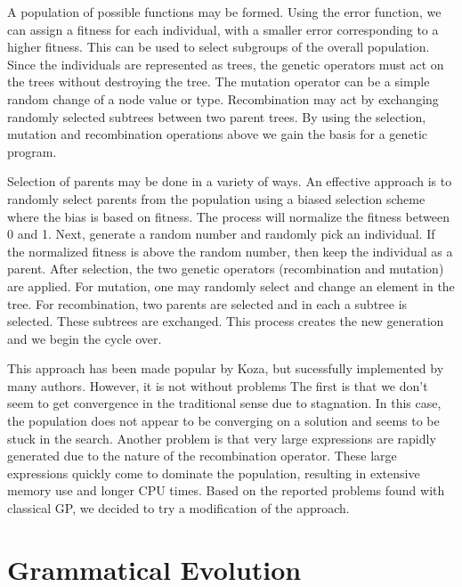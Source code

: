\documentclass[12pt]{article}
\begin{document}
A population of possible functions may be formed.  Using the error
function, we can assign a fitness for each individual, with a smaller
error corresponding to a higher fitness.  This can be used to select
subgroups of the overall population.  Since the individuals are
represented as trees, the genetic operators must act on the trees
without destroying the tree.  The mutation operator can be a simple
random change of a node value or type.  Recombination may act by
exchanging randomly selected subtrees between two parent trees.  By
using the selection, mutation and recombination operations above we
gain the basis for a genetic program.


Selection of parents may be done in a variety of ways.  An effective
approach is to randomly select parents from the population using a
biased selection scheme where the bias is based on fitness. The
process will normalize the fitness between 0 and 1.  Next, generate a
random number and randomly pick an individual.  If the normalized
fitness is above the random number, then keep the individual as a
parent. After selection, the two genetic operators (recombination and
mutation) are applied.  For mutation, one may randomly select and
change an element in the tree.  For recombination, two parents are
selected and in each a subtree is selected.  These subtrees are
exchanged.  This process creates the new generation and we begin the
cycle over.

This approach has been made popular by Koza, but sucessfully
implemented by many authors.  However, it is not without problems The
first is that we don't seem to get convergence in the traditional
sense due to stagnation.  In this case, the population does not appear
to be converging on a solution and seems to be stuck in the search.
Another problem is that very large expressions are rapidly generated
due to the nature of the recombination operator.  These large
expressions quickly come to dominate the population, resulting in
extensive memory use and longer CPU times.  Based on the reported
problems found with classical GP, we decided to try a modification of
the approach.


\section{Grammatical Evolution}
\end{document}
